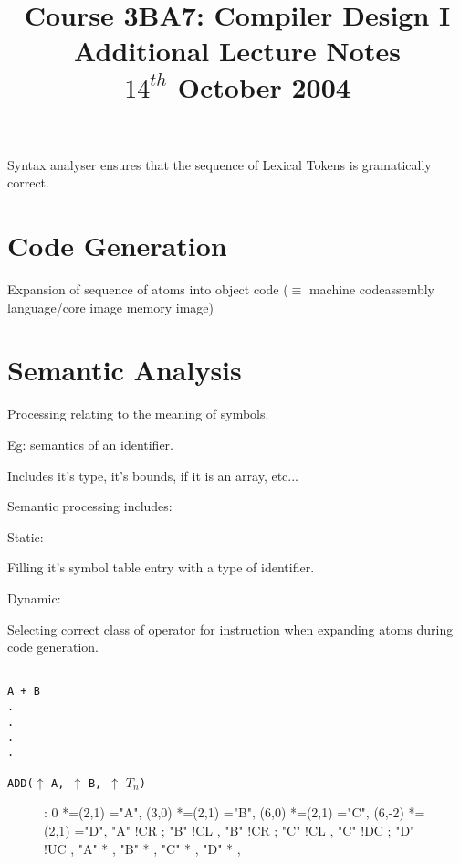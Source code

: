 \documentclass[a4paper,12pt]{article}
\begin{document}
\title{Course 3BA7: Compiler Design I \\ Additional Lecture Notes \\ $14^{th}$ October 2004}

\maketitle

Syntax analyser ensures that the sequence of Lexical Tokens is
gramatically correct.

\section{Code Generation}

Expansion of sequence of atoms into object code ($\equiv$ machine
codeassembly language/core image memory image)


\section{Semantic Analysis}

Processing relating to the meaning of symbols.

Eg: semantics of an identifier.

	Includes it's type, it's bounds, if it is an array, etc...

Semantic processing includes:

	Static:

		Filling it's symbol table entry with a type of identifier.

	Dynamic:	

		Selecting correct class of operator for instruction when expanding
		atoms during code generation.

\begin{verbatim}

A + B
.
.
.
.
\end{verbatim}

\verb!ADD(!$\uparrow$ \verb!A, !$\uparrow$ \verb!B, !$\uparrow$ $T_{n}$\verb!)!

\begin{figure}[ht]

\xy <1cm,0cm>:
0 *=(2,1)\frm{-} ="A",
(3,0) *=(2,1)\frm{-} ="B",
(6,0) *=(2,1)\frm{-} ="C",
(6,-2) *=(2,1)\frm{-} ="D",
\POS "A" !CR \ar ; "B" !CL ,
\POS "B" !CR \ar ; "C" !CL ,
\POS "C" !DC \ar ; "D" !UC ,
\POS "A" *{} ,
\POS "B" *{} ,
\POS "C" *{} ,
\POS "D" *{} ,
\endxy

\end{figure}
\end{document}
